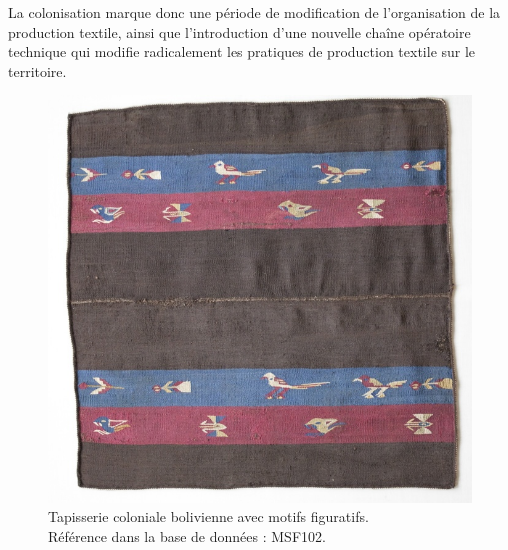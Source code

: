 \noindent La colonisation marque donc une période de modification de l'organisation de la production textile, ainsi que l'introduction d'une nouvelle chaîne opératoire technique qui modifie radicalement les pratiques de production textile sur le territoire.

\begin{figure}[!ht]
       \begin{center}
        		\includegraphics[width=12cm]{../images/MSF102.jpg}
		\caption[Tapisserie coloniale bolivienne avec motifs figuratifs]{Tapisserie coloniale bolivienne avec motifs figuratifs.	\protect\footnotemark \\ Référence dans la base de données : MSF102.}
	\label{fig:MSF102}
	\end{center}
\end{figure}


